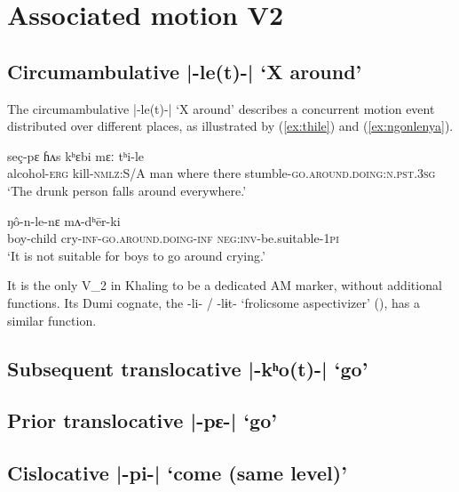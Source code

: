 \documentclass[oneside,a4paper,11pt]{article}
\newcommand{\ipa}[1]{{\phon#1}}
\newcommand{\dhatu}[2]{|\ipa{#1}| `#2'}
\begin{document}
\section{Associated motion V2}

\subsection{Circumambulative \dhatu{-le(t)-}{X around}} \label{sec:v2.le}
The circumambulative \dhatu{-le(t)-}{X around} describes a concurrent motion event distributed over different places, as illustrated by (\ref{ex:thile}) and (\ref{ex:ngonlenya}).

\begin{exe}
\ex \label{ex:thile}
 \gll  \ipa{tsi-ʔɛ} \ipa{seç-pɛ} \ipa{ɦʌs} \ipa{kʰɛbi} \ipa{mɛː} \ipa{tʰi-le} \\
 alcohol-\textsc{erg} kill-\textsc{nmlz}:S/A man where there stumble-\textsc{go.around.doing}:\textsc{n.pst.3sg} \\
 \glt `The drunk person falls around everywhere.' 
\end{exe}

\begin{exe}
\ex \label{ex:ngonlenya}
 \gll \ipa{lɛsbɛ-ʦɵ} \ipa{ŋô-n-le-nɛ} \ipa{mʌ-dʰēr-ki} \\
 boy-child cry-\textsc{inf}-\textsc{go.around.doing}-\textsc{inf} \textsc{neg}:\textsc{inv}-be.suitable-\textsc{1pi} \\
\glt `It is not suitable for boys to go around crying.' 
\end{exe}



It is the only V_2 in Khaling to be a dedicated AM marker, without additional functions. Its Dumi cognate, the \ipa{-li- / -lɨt-} `frolicsome aspectivizer' (\citealt[209-210]{driem93dumi}), has a similar function.


\subsection{Subsequent translocative \dhatu{-kʰo(t)-}{go}} \label{sec:v2.khot}
\subsection{Prior translocative \dhatu{-pɛ-}{go}} \label{sec:v2.pE}
\subsection{Cislocative \dhatu{-pi-}{come (same level)}} \label{sec:v2.pi}
\end{document}
